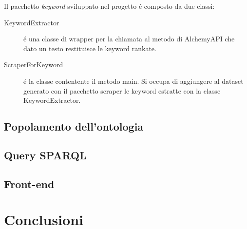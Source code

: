 \documentclass[11pt,twoside,a4paper]{article}
\begin{document}
Il pacchetto \emph{keyword} sviluppato nel progetto \'e composto da due classi:
\begin{description}
	\item[KeywordExtractor] \'e una classe di wrapper per la chiamata al metodo di AlchemyAPI che dato un testo restituisce le keyword rankate.
	\item[ScraperForKeyword] \'e la classe contentente il metodo main. Si occupa di aggiungere al dataset generato con il pacchetto scraper le keyword estratte con la classe KeywordExtractor.
\end{description}

\subsection{Popolamento dell'ontologia}

\subsection{Query SPARQL}

\subsection{Front-end}

\section{Conclusioni}
\label{sec:conclusions}
\end{document}
